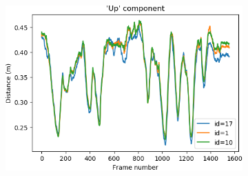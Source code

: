 \begin{figure}
    \centering
        \begin{subfigure}[b]{0.49\textwidth}
         \centering
         \includegraphics[width=\textwidth]{images/jiri.csv_figure_u}
    \end{subfigure}


\end{figure}
